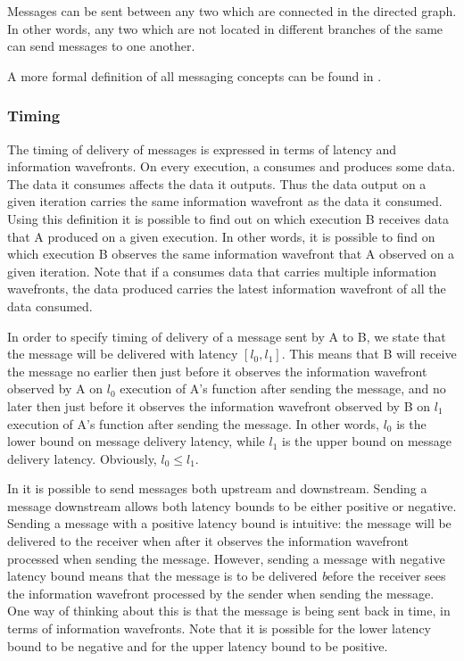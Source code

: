 Messages can be sent between any two {\filters} which are connected
in the directed {\StreamIt} graph.  In other words, any two {\filters}
which are not located in different branches of the same {\splitjoin}
can send messages to one another.

A more formal definition of all messaging concepts can be found in
\cite{streamittech2}.

\subsubsection{Timing}

The timing of delivery of messages is expressed in terms of
latency and information wavefronts.  On every execution, a {\filter}
consumes and produces some data.  The data it consumes affects the
data it outputs.  Thus the data output on a given iteration
carries the same information wavefront as the data it consumed.
Using this definition it is possible to find out on which
execution {\filter} B receives data that {\filter} A produced on a
given execution.  In other words, it is possible to find on which
execution {\filter} B observes the same information wavefront that
{\filter} A observed on a given iteration.  Note that if a {\filter}
consumes data that carries multiple information wavefronts, the
data produced carries the latest information wavefront of all the
data consumed.

In order to specify timing of delivery of a message sent by
{\filter} A to {\filter} B, we state that the message will be
delivered with latency $[l_0, l_1]$.  This means that {\filter} B
will receive the message no earlier then just before it observes
the information wavefront observed by {\filter} A on $l_0$ execution
of {\filter} A's {\work} function after sending the message, and no
later then just before it observes the information wavefront
observed by {\filter} B on $l_1$ execution of {\filter} A's {\work}
function after sending the message.  In other words, $l_0$ is the
lower bound on message delivery latency, while $l_1$ is the upper
bound on message delivery latency. Obviously, $l_0 \le l_1$.

In {\StreamIt} it is possible to send messages both upstream and
downstream.  Sending a message downstream allows both latency
bounds to be either positive or negative.  Sending a message with
a positive latency bound is intuitive: the message will be
delivered to the receiver when after it observes the information
wavefront processed when sending the message. However, sending a
message with negative latency bound means that the message is to
be delivered {\emph before} the receiver sees the information
wavefront processed by the sender when sending the message.  One
way of thinking about this is that the message is being sent back
in time, in terms of information wavefronts.  Note that it is
possible for the lower latency bound to be negative and for the
upper latency bound to be positive.


